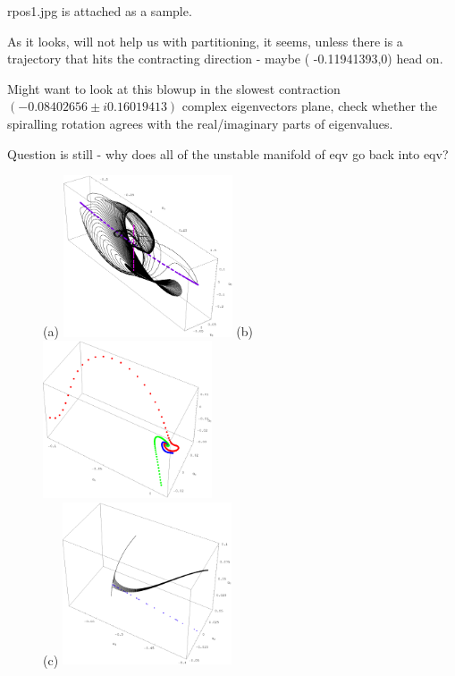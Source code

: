 rpos1.jpg is attached as a sample.

As it looks, will not help us with partitioning, it seems, unless there is
a trajectory that hits the contracting direction - maybe
( -0.11941393,0)
head on.

Might want to look at this blowup in
the  slowest contraction
$   ( -0.08402656 \pm i 0.16019413)$
complex eigenvectors plane, check whether the
spiralling rotation agrees with the real/imaginary parts of eigenvalues.

Question is still - why does all of the unstable manifold of
 eqv go back
into
 eqv?

\begin{figure}[h]
\centering
(a) \includegraphics[width=5.0cm]{figs/L22-2w-UnsMan.eps}
\hspace{0.1in}
(b) \includegraphics[width=5.0cm]{figs/L22-2w-UnsMan-BlowUp.eps}
\\
(c) \includegraphics[width=5.0cm]{figs/L22-2w-3w-UnsMan.eps}

\end{figure}
